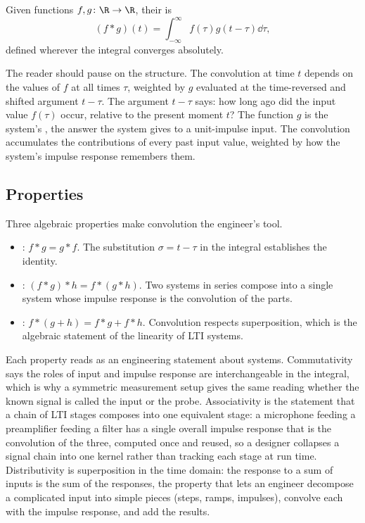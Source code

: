 \begin{definition}
Given functions $f, g \colon \R \to \R$, their 
is
\[
(f * g)(t) = \int_{-\infty}^{\infty} f(\tau) g(t - \tau) \dd \tau,
\]
defined wherever the integral converges absolutely.
\end{definition}

The reader should pause on the structure. The convolution at time
$t$ depends on the values of $f$ at all times $\tau$, weighted by
$g$ evaluated at the time-reversed and shifted argument $t - \tau$.
The argument $t - \tau$ says: how long ago did the input value
$f(\tau)$ occur, relative to the present moment $t$? The function
$g$ is the system's , the answer the
system gives to a unit-impulse input. The convolution accumulates
the contributions of every past input value, weighted by how the
system's impulse response remembers them.

\subsection{Properties}

Three algebraic properties make convolution the engineer's tool.

\begin{itemize}[leftmargin=*]
  \item {}: $f * g = g * f$. The substitution
    $\sigma = t - \tau$ in the integral establishes the identity.
  \item {}: $(f * g) * h = f * (g * h)$. Two
    systems in series compose into a single system whose impulse
    response is the convolution of the parts.
  \item {}: $f * (g + h) = f * g
    + f * h$. Convolution respects superposition, which is the
    algebraic statement of the linearity of LTI systems.
\end{itemize}

Each property reads as an engineering statement about systems.
Commutativity says the roles of input and impulse response are
interchangeable in the integral, which is why a symmetric measurement
setup gives the same reading whether the known signal is called the input
or the probe. Associativity is the statement that a chain of LTI stages
composes into one equivalent stage: a microphone feeding a preamplifier
feeding a filter has a single overall impulse response that is the
convolution of the three, computed once and reused, so a designer
collapses a signal chain into one kernel rather than tracking each stage
at run time. Distributivity is superposition in the time domain: the
response to a sum of inputs is the sum of the responses, the property
that lets an engineer decompose a complicated input into simple pieces
(steps, ramps, impulses), convolve each with the impulse response, and
add the results.

